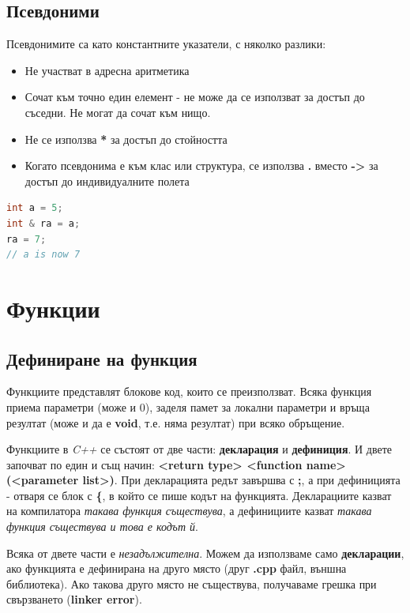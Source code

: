 \documentclass[fleqn,12pt]{article}
\begin{document}
\subsection{Псевдоними}
\label{references}
Псевдонимите са като константните указатели, с няколко разлики:
\begin{itemize}
    \item Не участват в адресна аритметика
    \item Сочат към точно един елемент - не може да се използват за достъп до съседни. Не могат да сочат към нищо.
    \item Не се използва \textbf{*} за достъп до стойността
    \item Когато псевдонима е към клас или структура, се използва \textbf{.} вместо \textbf{->} за достъп до индивидуалните полета
\end{itemize}

\begin{lstlisting}[language=C++, caption=Pointer example 2]
int a = 5;
int & ra = a;
ra = 7;
// a is now 7
\end{lstlisting}

\section{Функции}
\subsection{Дефиниране на функция}
Функциите представлят блокове код, които се преизползват. Всяка функция приема параметри (може и 0),
заделя памет за локални параметри и връща резултат (може и да е \textbf{void}, т.е. няма резултат)
при всяко обръщение.

Функциите в \textit{C++} се състоят от две части: \textbf{декларация} и \textbf{дефиниция}.
И двете започват по един и същ начин: \textbf{<return type> <function name>(<parameter list>)}.
При декларацията редът завършва с \textbf{;}, а при дефиницията - отваря се блок с \textbf{\{}, 
в който се пише кодът на функцията. Декларациите казват на компилатора \textit{такава функция съществува},
а дефинициите казват \textit{такава функция съществува и това е кодът й}.

Всяка от двете части е \textit{незадължителна}. Можем да използваме само \textbf{декларации}, ако функцията е 
дефинирана на друго място (друг \textbf{.cpp} файл, външна библиотека). Ако такова друго място не съществува, 
получаваме грешка при свързването (\textbf{linker error}).
\end{document}
